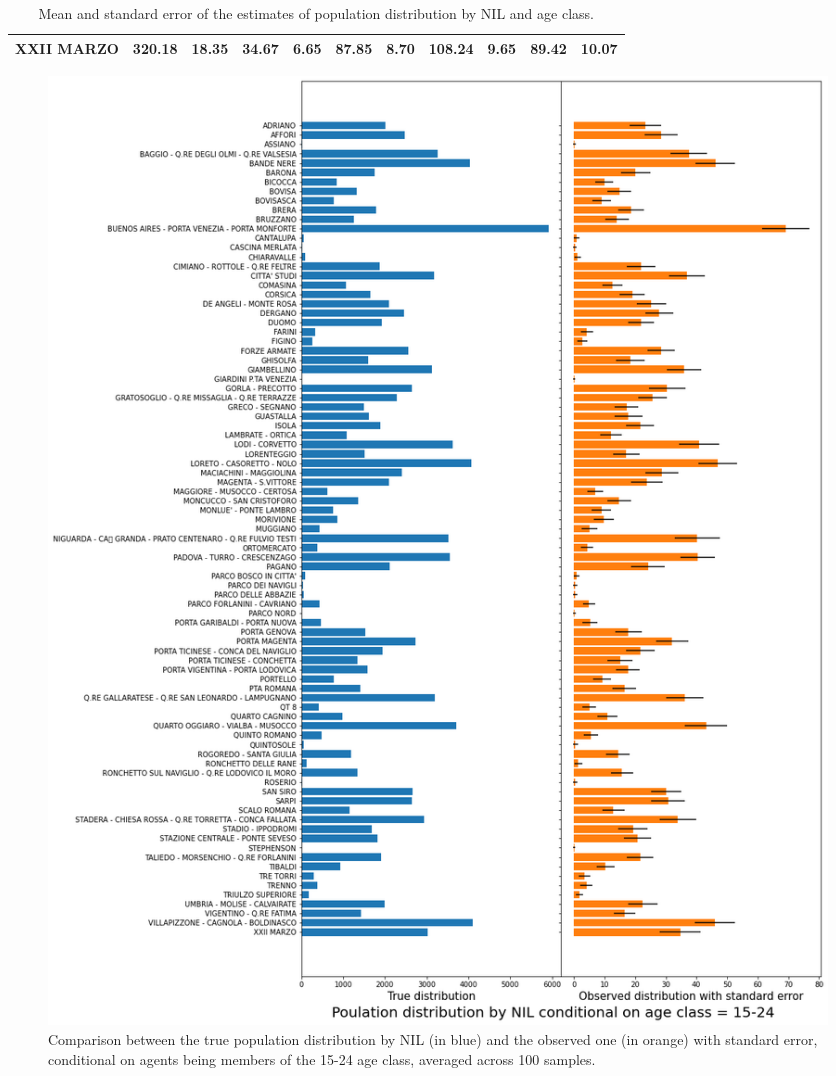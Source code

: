 \begin{table}[H]
{{\begin{tabular}{lp{1.3cm}p{1.3cm}p{1.3cm}p{1.3cm}p{1.3cm}p{1.3cm}p{1.3cm}p{1.3cm}p{1.3cm}p{1.3cm}}
XXII MARZO                                         &                    320.18 &                 18.35 &                       34.67 &                    6.65 &                       87.85 &                    8.70 &                      108.24 &                    9.65 &                     89.42 &                 10.07 \\
\bottomrule
\end{tabular}
}}
    \caption{Mean and standard error of the estimates of population distribution by NIL and age class.}
    \label{tab:pop_nil_msd}
\end{table}


\begin{figure}[H]
    \centering
    \includegraphics[scale = 0.45]{tex/pics/pop_by_nil_15.png}
    \caption{Comparison between the true population distribution by NIL (in blue) and the observed one (in orange) with standard error, conditional on agents being members of the 15-24 age class, averaged across 100 samples.}
    \label{pop_nil_15}
\end{figure}

